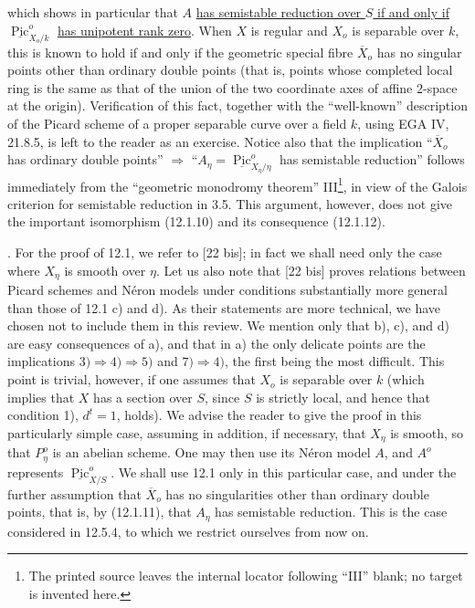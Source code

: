 \noindent
which shows in particular that $A$ \underline{has semistable reduction
over $S$ if and only if}
$\underline{\operatorname{Pic}}^o_{X_o/k}$ \underline{has unipotent rank
zero}. When $X$ is regular and $X_o$ is separable over $k$, this is known
to hold if and only if the geometric special fibre $\overline X_o$ has no
singular points other than ordinary double points (that is, points whose
completed local ring is the same as that of the union of the two
coordinate axes of affine $2$-space at the origin). Verification of this
fact, together with the ``well-known'' description of the Picard scheme
of a proper separable curve over a field $k$, using EGA IV, 21.8.5, is left
to the reader as an exercise. Notice also that the implication
``$\overline X_o$ has ordinary double points'' $\Longrightarrow$
``$A_\eta=\underline{\operatorname{Pic}}^o_{X_\eta/\eta}$ has semistable
reduction'' follows immediately from the ``geometric monodromy theorem''
III\footnote{The printed source leaves the internal locator following
``III'' blank; no target is invented here.}, in view of the Galois
criterion for semistable reduction in 3.5. This argument, however, does
not give the important isomorphism (12.1.10) and its consequence
(12.1.12).

\medskip
{}. For the proof of 12.1, we refer to [22 bis]; in fact we shall need
only the case where $X_\eta$ is smooth over $\eta$. Let us also note that
[22 bis] proves relations between Picard schemes and N\'eron models under
conditions substantially more general than those of 12.1 c) and d). As
their statements are more technical, we have chosen not to include them
in this review. We mention only that b), c), and d) are easy consequences
of a), and that in a) the only delicate points are the implications
$3)\Longrightarrow4)\Longrightarrow5)$ and $7)\Longrightarrow4)$, the
first being the most difficult. This point is trivial, however, if one
assumes that $X_o$ is separable over $k$ (which implies that $X$ has a
section over $S$, since $S$ is strictly local, and hence that condition
1), $d^t=1$, holds). We advise the reader to give the proof in this
particularly simple case, assuming in addition, if necessary, that
$X_\eta$ is smooth, so that $P_\eta^o$ is an abelian scheme. One may then
use its N\'eron model $A$, and $A^o$ represents
$\underline{\operatorname{Pic}}^o_{X/S}$. We shall use 12.1 only in this
particular case, and under the further assumption that $\overline X_o$
has no singularities other than ordinary double points, that is, by
(12.1.11), that $A_\eta$ has semistable reduction. This is the case
considered in 12.5.4, to which we restrict ourselves from now on.
